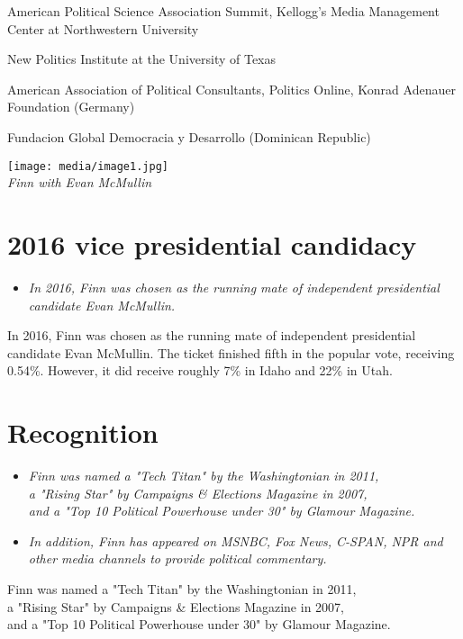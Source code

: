 American Political Science Association Summit, Kellogg's Media
Management Center at Northwestern University

New Politics Institute at the University of Texas

American Association of Political Consultants, Politics Online, Konrad
Adenauer Foundation (Germany)

Fundacion Global Democracia y Desarrollo (Dominican Republic)

\texttt{[image: media/image1.jpg]}\\
\emph{Finn with Evan McMullin}

\section{2016 vice presidential
candidacy}\label{vice-presidential-candidacy}

\begin{itemize}
\item
  \emph{In 2016, Finn was chosen as the running mate of independent
  presidential candidate Evan McMullin.}
\end{itemize}

In 2016, Finn was chosen as the running mate of independent presidential
candidate Evan McMullin. The ticket finished fifth in the popular vote,
receiving 0.54\%. However, it did receive roughly 7\% in Idaho and 22\%
in Utah.

\section{Recognition}\label{recognition}

\begin{itemize}
\item
  \emph{Finn was named a "Tech Titan" by the Washingtonian in 2011,\\
  a "Rising Star" by Campaigns \& Elections Magazine in 2007,\\
  and a "Top 10 Political Powerhouse under 30" by Glamour Magazine.}
\item
  \emph{In addition, Finn has appeared on MSNBC, Fox News, C-SPAN, NPR
  and other media channels to provide political commentary.}
\end{itemize}

Finn was named a "Tech Titan" by the Washingtonian in 2011,\\
a "Rising Star" by Campaigns \& Elections Magazine in 2007,\\
and a "Top 10 Political Powerhouse under 30" by Glamour Magazine.

